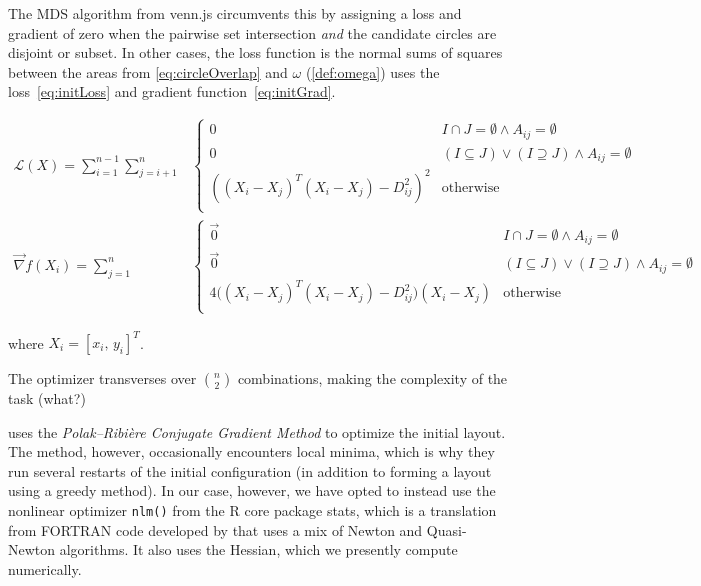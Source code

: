 \documentclass[
  a4paper,
  nofonts,
  nobib,
  titlepage,
  justified,
  marginals=raggedouter,
  nohyper
]{tufte-handout}\usepackage[]{graphicx}\usepackage[]{color}
\newcommand{\pkg}[1]{{\fontseries{b}\selectfont #1}}
\newcommand{\code}[1]{\texttt{#1}}
\begin{document}
The MDS algorithm from \pkg{venn.js} circumvents this by assigning a loss and
gradient of zero when the pairwise set intersection \emph{and} the candidate circles
are disjoint or subset. In other cases, the loss function
is the normal sums of squares between the areas from
\eqref{eq:circleOverlap} and $\omega$ (\cref{def:omega})
uses the loss~\eqref{eq:initLoss} and gradient function~\eqref{eq:initGrad}.
\begin{fullwidth}
\begin{align}
\mathcal{L}(X) = \sum_{i=1}^{n-1} \sum_{j=i+1}^{n}
& \begin{cases}
  0 & I \cap J = \emptyset \wedge A_{ij} = \emptyset\\
  0 & (I \subseteq J) \vee (I \supseteq J) \wedge A_{ij}=\emptyset\\
  ((X_i - X_j)^T(X_i - X_j) - D_{ij}^2) ^2  & \text{otherwise} \\
\end{cases} \label{eq:initLoss} \\
\vec{\nabla} f(X_i) = \sum_{j=1}^n
& \begin{cases}
  \vec{0} & I \cap J = \emptyset \wedge A_{ij} = \emptyset\\
  \vec{0} & (I \subseteq J) \vee (I \supseteq J) \wedge A_{ij}=\emptyset\\
  4 \big((X_i - X_j)^T(X_i - X_j) - D_{ij}^2\big) (X_i - X_j) & \text{otherwise} \\
\end{cases} \label{eq:initGrad}
\end{align}
\end{fullwidth}
where $X_i = \left[ x_i,\,  y_i \right]^T$.

The optimizer transverses over $\binom{n}{2}$ combinations, making the
complexity of the task (what?)

\citet{frederickson_2016} uses the \emph{Polak--Ribière Conjugate Gradient Method} to optimize
the initial layout. The method, however, occasionally encounters local minima,
which is why they run several restarts of the initial
configuration (in addition to forming a layout using a greedy method). In our
case, however, we have opted to instead use the
nonlinear optimizer \code{nlm()} from the \pkg{R} core package \pkg{stats}, which is a
translation from FORTRAN code developed by \citet{schnabel_1985} that uses a mix
of Newton and Quasi-Newton algorithms. It also uses the Hessian, which we
presently compute numerically.
\end{document}
